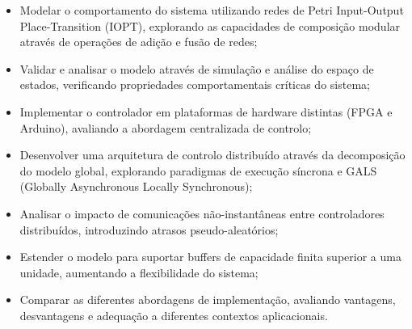 \begin{itemize}
    \item Modelar o comportamento do sistema utilizando redes de Petri Input-Output Place-Transition (IOPT), explorando as capacidades de composição modular através de operações de adição e fusão de redes;
    
    \item Validar e analisar o modelo através de simulação e análise do espaço de estados, verificando propriedades comportamentais críticas do sistema;
    
    \item Implementar o controlador em plataformas de hardware distintas (FPGA e Arduino), avaliando a abordagem centralizada de controlo;
    
    \item Desenvolver uma arquitetura de controlo distribuído através da decomposição do modelo global, explorando paradigmas de execução síncrona e GALS (Globally Asynchronous Locally Synchronous);
    
    \item Analisar o impacto de comunicações não-instantâneas entre controladores distribuídos, introduzindo atrasos pseudo-aleatórios;
    
    \item Estender o modelo para suportar buffers de capacidade finita superior a uma unidade, aumentando a flexibilidade do sistema;
    
    \item Comparar as diferentes abordagens de implementação, avaliando vantagens, desvantagens e adequação a diferentes contextos aplicacionais.
\end{itemize}
